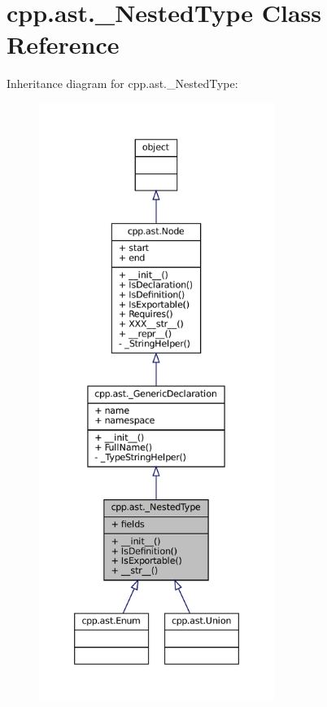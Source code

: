 \hypertarget{classcpp_1_1ast_1_1__NestedType}{}\section{cpp.\+ast.\+\_\+\+Nested\+Type Class Reference}
\label{classcpp_1_1ast_1_1__NestedType}


Inheritance diagram for cpp.\+ast.\+\_\+\+Nested\+Type\+:
\nopagebreak
\begin{figure}[H]
\begin{center}
\leavevmode
\includegraphics[height=550pt]{classcpp_1_1ast_1_1__NestedType__inherit__graph}
\end{center}
\end{figure}


